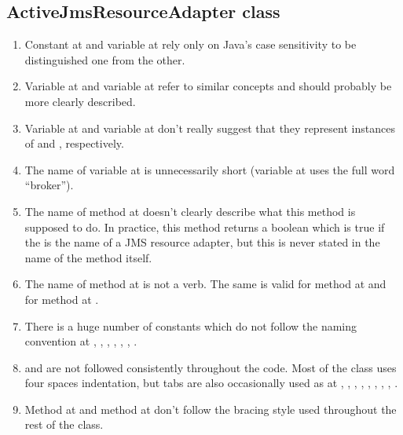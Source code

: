 \subsection{ActiveJmsResourceAdapter class}
\begin{enumerate}
	\item {} Constant  at  and variable  at  rely only on Java's case sensitivity to be distinguished one from the other. 
	\item {} Variable  at  and variable  at  refer to similar concepts and should probably be more clearly described. 
	\item {} Variable  at  and variable  at  don't really suggest that they represent instances of  and , respectively.
	\item {} The name of variable  at  is unnecessarily short (variable  at  uses the full word “broker”). 
	\item {} The name of method  at  doesn't clearly describe what this method is supposed to do. In practice, this method returns a boolean which is true if the  is the name of a JMS resource adapter, but this is never stated in the name of the method itself. 
	\item {} The name of method  at  is not a verb. The same is valid for method  at  and for method  at .
	\item {} There is a huge number of constants which do not follow the naming convention at , , , , , , . 
	\item {} and  are not followed consistently throughout the code. Most of the class uses four spaces indentation, but tabs are also occasionally used as at , , , , , , , , . 
	\item {} Method  at  and method  at  don't follow the bracing style used throughout the rest of the class.

\end{enumerate}
